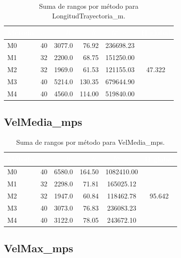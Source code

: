 \documentclass[12pt,a4paper,oneside]{book}
\begin{document}
\begin{table}[H]
\centering
\small
\caption{Suma de rangos por método para LongitudTrayectoria\_m.}
\begin{tabular}{lcrrcc}
\toprule
\rowcolor{primary}
\textcolor{white}{\textbf{Método}} & \textcolor{white}{$n_j$} & \textcolor{white}{$R_j$} & \textcolor{white}{$\bar{R}_j$} & \textcolor{white}{$R_j^2/n_j$} & \textcolor{white}{H global} \\
\midrule
M0 & 40 & 3077.0 & 76.92 & 236698.23 & \multirow{5}{*}{47.322} \\
M1 & 32 & 2200.0 & 68.75 & 151250.00 & \\
M2 & 32 & 1969.0 & 61.53 & 121155.03 & \\
M3 & 40 & 5214.0 & 130.35 & 679644.90 & \\
M4 & 40 & 4560.0 & 114.00 & 519840.00 & \\
\bottomrule
\end{tabular}
\end{table}

\subsection{VelMedia\_mps}

\begin{table}[H]
\centering
\small
\caption{Suma de rangos por método para VelMedia\_mps.}
\begin{tabular}{lcrrcc}
\toprule
\rowcolor{primary}
\textcolor{white}{\textbf{Método}} & \textcolor{white}{$n_j$} & \textcolor{white}{$R_j$} & \textcolor{white}{$\bar{R}_j$} & \textcolor{white}{$R_j^2/n_j$} & \textcolor{white}{H global} \\
\midrule
M0 & 40 & 6580.0 & 164.50 & 1082410.00 & \multirow{5}{*}{95.642} \\
M1 & 32 & 2298.0 & 71.81 & 165025.12 & \\
M2 & 32 & 1947.0 & 60.84 & 118462.78 & \\
M3 & 40 & 3073.0 & 76.83 & 236083.23 & \\
M4 & 40 & 3122.0 & 78.05 & 243672.10 & \\
\bottomrule
\end{tabular}
\end{table}

\subsection{VelMax\_mps}
\end{document}
